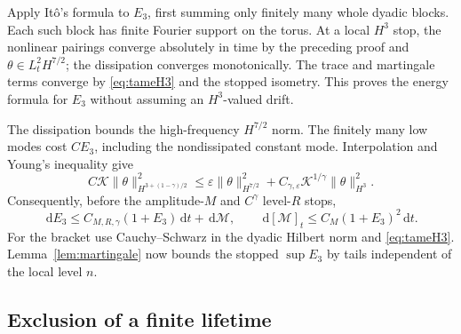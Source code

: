 \documentclass[11pt]{amsart}
\theoremstyle{remark}
\numberwithin{equation}{section}
\newcommand{\dd}{\,\mathrm d}
\newcommand{\norm}[1]{\lVert#1\rVert}
\begin{document}
Apply It\^o's formula to $E_3$, first summing only finitely many whole dyadic
blocks. Each such block has finite Fourier support on the torus. At a local
$H^3$ stop, the nonlinear pairings converge absolutely in time by the preceding
proof and $\theta\in L^2_tH^{7/2}$; the dissipation converges monotonically.
The trace and martingale terms converge by \eqref{eq:tameH3} and the stopped
isometry. This proves the energy formula for $E_3$ without assuming an
$H^3$-valued drift.

The dissipation bounds the high-frequency $H^{7/2}$ norm. The finitely many
low modes cost $CE_3$, including the nondissipated constant mode.
Interpolation and Young's inequality give
\[
 C\mathcal K\norm{\theta}_{H^{3+(1-\gamma)/2}}^2
 \leq\varepsilon\norm{\theta}_{H^{7/2}}^2
       +C_{\gamma,\varepsilon}\mathcal K^{1/\gamma}\norm{\theta}_{H^3}^2.
\]
Consequently, before the amplitude-$M$ and $C^\gamma$ level-$R$ stops,
\begin{equation}\label{eq:H3energy}
 \dd E_3\leq C_{M,R,\gamma}(1+E_3)\dd t+\dd\mathcal M,
 \qquad \dd[\mathcal M]_t\leq C_M(1+E_3)^2\dd t.
\end{equation}
For the bracket use Cauchy--Schwarz in the dyadic Hilbert norm and
\eqref{eq:tameH3}. Lemma~\ref{lem:martingale} now bounds the stopped
$\sup E_3$ by tails independent of the local level $n$.

\subsection{Exclusion of a finite lifetime}
\end{document}
